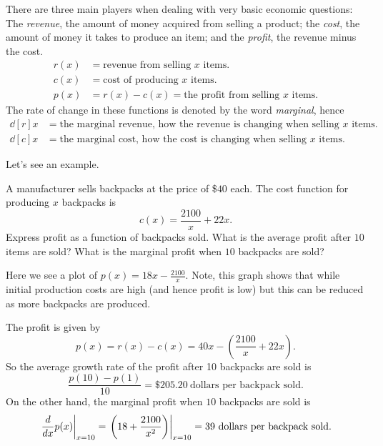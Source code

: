 There are three main players when dealing with very basic economic
questions: The \textit{revenue}, the amount of money acquired from
selling a product; the \textit{cost}, the amount of money it takes to
produce an item; and the \textit{profit}, the revenue minus the cost.
\begin{align*}
r(x) &= \text{revenue from selling $x$ items.}\\
c(x) &= \text{cost of producing $x$ items.}\\
p(x) &= r(x)-c(x) = \text{the profit from selling $x$ items}.
\end{align*}
The rate of change in these functions is denoted by the word \textit{marginal}, hence 
\begin{align*}
\dd[r]{x} &= \text{the marginal revenue, how the revenue is changing when selling $x$ items.}\\
\dd[c]{x} &= \text{the marginal cost, how the cost is changing when selling $x$ items.}
\end{align*}

Let's see an example.

\begin{example}
A manufacturer sells backpacks at the price of \$$40$ each. The cost function for producing $x$ backpacks is
\[
c(x) = \frac{2100}{x} + 22x.
\]
Express profit as a function of backpacks sold. What is the average
profit after $10$ items are sold? What is the marginal profit when
$10$ backpacks are sold?
\end{example}
\begin{marginfigure}
\caption{Here we see a plot of $p(x) = 18x - \frac{2100}{x}$. Note,
  this graph shows that while initial production costs are high (and
  hence profit is low) but this can be reduced as more backpacks are
  produced.}
\end{marginfigure}
\begin{solution}
The profit is given by
\[
p(x) = r(x) - c(x)  = 40x - \left(\frac{2100}{x} + 22x\right).
\]
So the average growth rate of the profit after 10 backpacks are sold is
\[
\frac{p(10)-p(1)}{10} = \$205.20~\text{dollars per backpack sold}.
\]
On the other hand, the marginal profit when $10$ backpacks are sold is
\[
\left.\frac{d}{dx} p(x) \right|_{x=10} = \left.\left(18 + \frac{2100}{x^2}\right) \right|_{x=10} = 39~\text{dollars per backpack sold}.
\]

\end{solution}




